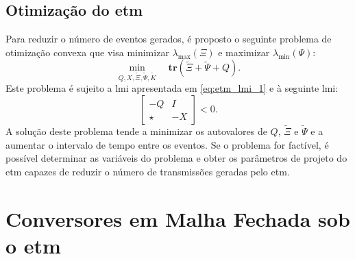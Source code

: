 \subsection{Otimização do \acrshort{etm}}


Para reduzir o número de eventos gerados, é proposto o seguinte problema de otimização convexa que visa minimizar $\lambda_{\max} (\Xi)$ e maximizar $\lambda_{\min}(\Psi)$: \begin{equation}\underset{Q, X, \tilde{\Xi}, \tilde{\Psi}, \tilde{K}}\min \quad \mathbf{tr}(\tilde{\Xi} + \tilde{\Psi} + Q). \label{eq:optimization_problem}\end{equation} Este problema é sujeito a \acrshort{lmi} apresentada em \eqref{eq:etm_lmi_1} e à seguinte \acrshort{lmi}: \begin{equation}\begin{bmatrix}
  -Q & I \\ \star & -X
\end{bmatrix} < 0. \label{eq:constraints_2}\end{equation} A solução deste problema tende a minimizar os autovalores de $Q$, $\tilde{\Xi}$ e $\tilde{\Psi}$ e a aumentar o intervalo de tempo entre os eventos. Se o problema for factível, é possível determinar as variáveis do problema e obter os parâmetros de projeto do \acrshort{etm} capazes de reduzir o número de transmissões geradas pelo \acrshort{etm}.

\section{Conversores em Malha Fechada sob o \acrshort{etm}}